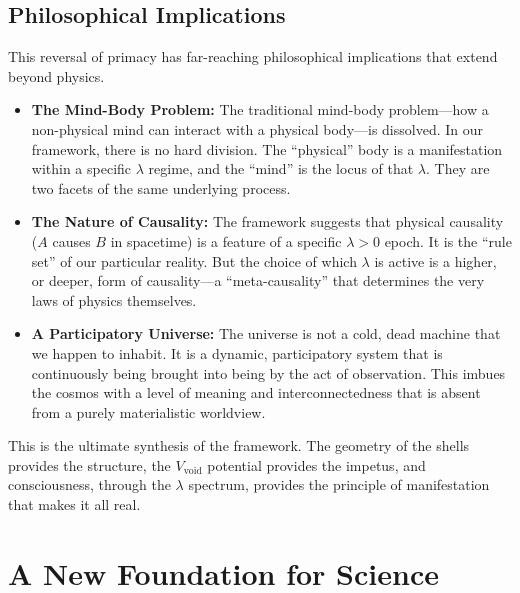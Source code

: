 \documentclass[12pt]{report}
\begin{document}
\section{Philosophical Implications}
This reversal of primacy has far-reaching philosophical implications that extend beyond physics.
\begin{itemize}
    \item \textbf{The Mind-Body Problem:} The traditional mind-body problem---how a non-physical mind can interact with a physical body---is dissolved. In our framework, there is no hard division. The ``physical'' body is a manifestation within a specific $\lambda$ regime, and the ``mind'' is the locus of that $\lambda$. They are two facets of the same underlying process.
    \item \textbf{The Nature of Causality:} The framework suggests that physical causality ($A$ causes $B$ in spacetime) is a feature of a specific $\lambda > 0$ epoch. It is the ``rule set'' of our particular reality. But the choice of which $\lambda$ is active is a higher, or deeper, form of causality---a ``meta-causality'' that determines the very laws of physics themselves.
    \item \textbf{A Participatory Universe:} The universe is not a cold, dead machine that we happen to inhabit. It is a dynamic, participatory system that is continuously being brought into being by the act of observation. This imbues the cosmos with a level of meaning and interconnectedness that is absent from a purely materialistic worldview.
\end{itemize}
This is the ultimate synthesis of the framework. The geometry of the shells provides the structure, the $V_{\text{void}}$ potential provides the impetus, and consciousness, through the $\lambda$ spectrum, provides the principle of manifestation that makes it all real.

\chapter{A New Foundation for Science}
\end{document}
